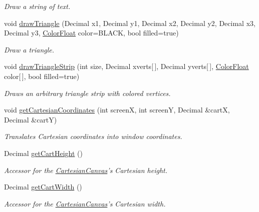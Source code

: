 \begin{DoxyCompactItemize}
\begin{DoxyCompactList}\small\item\em \-Draw a string of text. \end{DoxyCompactList}\item 
void \hyperlink{classtsgl_1_1_cartesian_canvas_a67c225592f9416de476943bb93309cd1}{draw\-Triangle} (\-Decimal x1, \-Decimal y1, \-Decimal x2, \-Decimal y2, \-Decimal x3, \-Decimal y3, \hyperlink{structtsgl_1_1_color_float}{\-Color\-Float} color=\-B\-L\-A\-C\-K, bool filled=true)
\begin{DoxyCompactList}\small\item\em \-Draw a triangle. \end{DoxyCompactList}\item 
void \hyperlink{classtsgl_1_1_cartesian_canvas_a924f6148489c634ec4d47970e498a26a}{draw\-Triangle\-Strip} (int size, \-Decimal xverts\mbox{[}$\,$\mbox{]}, \-Decimal yverts\mbox{[}$\,$\mbox{]}, \hyperlink{structtsgl_1_1_color_float}{\-Color\-Float} color\mbox{[}$\,$\mbox{]}, bool filled=true)
\begin{DoxyCompactList}\small\item\em \-Draws an arbitrary triangle strip with colored vertices. \end{DoxyCompactList}\item 
void \hyperlink{classtsgl_1_1_cartesian_canvas_a736935074bb6d90bcc0c7af2edd8a4aa}{get\-Cartesian\-Coordinates} (int screen\-X, int screen\-Y, \-Decimal \&cart\-X, \-Decimal \&cart\-Y)
\begin{DoxyCompactList}\small\item\em \-Translates \-Cartesian coordinates into window coordinates. \end{DoxyCompactList}\item 
\-Decimal \hyperlink{classtsgl_1_1_cartesian_canvas_a66657636eaf20ff465898d3f932063ce}{get\-Cart\-Height} ()
\begin{DoxyCompactList}\small\item\em \-Accessor for the \hyperlink{classtsgl_1_1_cartesian_canvas}{\-Cartesian\-Canvas}'s \-Cartesian height. \end{DoxyCompactList}\item 
\-Decimal \hyperlink{classtsgl_1_1_cartesian_canvas_a829a97323261515097b7589bc96c109c}{get\-Cart\-Width} ()
\begin{DoxyCompactList}\small\item\em \-Accessor for the \hyperlink{classtsgl_1_1_cartesian_canvas}{\-Cartesian\-Canvas}'s \-Cartesian width. \end{DoxyCompactList}\item 

\end{DoxyCompactItemize}
